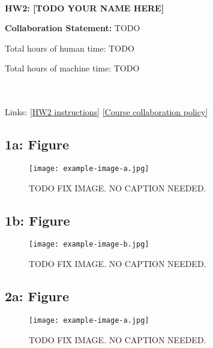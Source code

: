 \documentclass[10pt]{article}
\begin{document}
~~\\ %

{\Large{\bf HW2: [TODO YOUR NAME HERE] }}

\Large{\bf Collaboration Statement:} TODO

Total hours of human time: TODO

Total hours of machine time: TODO


~~\\
~~\\
Links: 
\href{https://www.cs.tufts.edu/cs/152L3D/2024f/hw2.html}{[HW2 instructions]} 
\href{https://www.cs.tufts.edu/cs/152L3D/2024f/index.html#collaboration}{[Course collaboration policy]} 

\setcounter{tocdepth}{3}
\tableofcontents

\newpage

\subsection{1a: Figure}
\renewcommand{\figurename}{Fig.}
\renewcommand{\thefigure}{1a}
 \begin{figure}[!h]
     \centering
     \texttt{[image: example-image-a.jpg]}
     \label{fig:1a}
\caption{
TODO FIX IMAGE. NO CAPTION NEEDED.
}%
 \end{figure}

\subsection{1b: Figure}
\renewcommand{\figurename}{Fig.}
\renewcommand{\thefigure}{1b}
 \begin{figure}[!h]
     \centering
     \texttt{[image: example-image-b.jpg]}
     \label{fig:1b}
\caption{
TODO FIX IMAGE. NO CAPTION NEEDED.
}%
 \end{figure}

\newpage 

\subsection{2a: Figure}
\renewcommand{\figurename}{Fig.}
\renewcommand{\thefigure}{2a}
 \begin{figure}[!h]
     \centering
     \texttt{[image: example-image-a.jpg]}
     \label{fig:2a}
\caption{
TODO FIX IMAGE. NO CAPTION NEEDED.
}%
 \end{figure}
\end{document}

